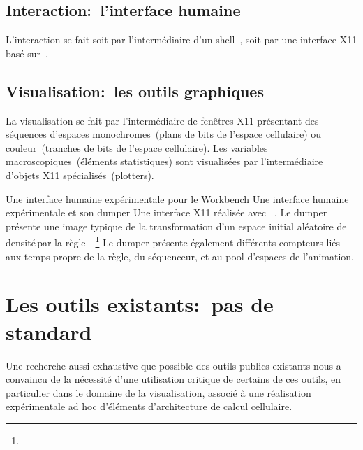 \subsection*{Interaction:~l'interface humaine}

L'interaction se fait soit par l'interm\'ediaire d'un shell~, soit
par une interface X11 bas\'e sur~. %

\subsection*{Visualisation:~les outils graphiques}

La visualisation se fait par l'interm\'ediaire de fen\^etres X11
pr\'esentant des s\'equences d'espaces monochromes~(plans de bits de
l'espace cellulaire) ou couleur~(tranches de bits de l'espace
cellulaire). %
Les variables macroscopiques~(\'el\'ements statistiques) sont visualis\'ees
par l'interm\'ediaire d'objets X11 sp\'ecialis\'es~(plotters). %

%
{Une interface humaine exp\'erimentale pour le Workbench}%
{Une interface humaine exp\'erimentale et son dumper}%
{Une interface X11 r\'ealis\'ee avec
  \protect{}~\cite[]{Ousterhout90,Ousterhout91}. %
  Le dumper pr\'esente une image typique de la transformation d'un espace
  initial al\'eatoire de densit\'e\,\Sundemi par la
  r\`egle~~\cite[]{Vichniac86,Toffoli87}\footnote{%
    } %
  Le dumper pr\'esente \'egalement diff\'erents compteurs li\'es aux temps
  propre de la r\`egle, du s\'equenceur, et au pool d'espaces de l'animation. %
}

\section{Les outils existants:~pas de standard}

Une recherche aussi exhaustive que possible des outils publics
existants nous a convaincu de la n\'ecessit\'e d'une utilisation critique
de certains de ces outils, en particulier dans le domaine de la
visualisation, associ\'e \`a une r\'ealisation exp\'erimentale ad hoc
d'\'el\'ements d'architecture de calcul cellulaire. %

